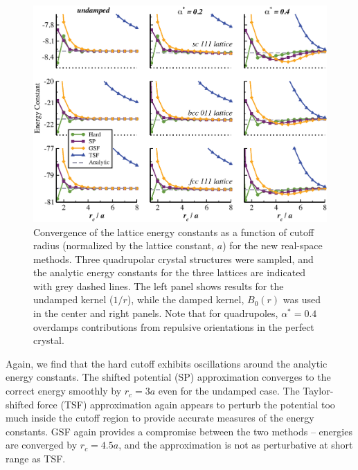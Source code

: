 \begin{figure}
\includegraphics[width=\linewidth]{Quadrupoles_rcut_threeAlpha.eps}
\caption{Convergence of the lattice energy constants as a function of
  cutoff radius (normalized by the lattice constant, $a$) for the new
  real-space methods. Three quadrupolar crystal structures were
  sampled, and the analytic energy constants for the three lattices
  are indicated with grey dashed lines. The left panel shows results
  for the undamped kernel ($1/r$), while the damped kernel, $B_0(r)$
  was used in the center and right panels.  Note that for quadrupoles,
  $\alpha^* = 0.4$ overdamps contributions from repulsive orientations
  in the perfect crystal.}
\label{fig:Quadrupoles_rCut}
\end{figure}

Again, we find that the hard cutoff exhibits oscillations around the
analytic energy constants.  The shifted potential (SP) approximation
converges to the correct energy smoothly by $r_c = 3 a$ even for the
undamped case.  The Taylor-shifted force (TSF) approximation again
appears to perturb the potential too much inside the cutoff region to
provide accurate measures of the energy constants.  GSF again provides
a compromise between the two methods -- energies are converged by $r_c
= 4.5 a$, and the approximation is not as perturbative at short range
as TSF.

